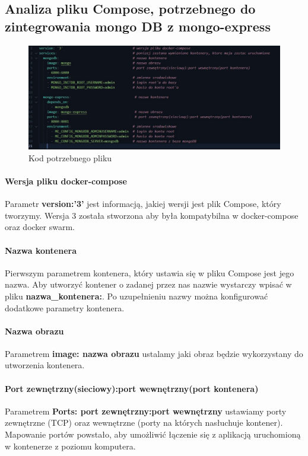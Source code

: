 \documentclass[12pt, a4paper]{article}
\begin{document}
    \subsection{Analiza pliku Compose, potrzebnego do zintegrowania mongo DB z mongo-express}
        \begin{figure}[!h]
            \centering
            \includegraphics[width=\textwidth]{docker-compose.JPG}
            \caption{Kod potrzebnego pliku}
            \label{fig:kod_docker-compose}
        \end{figure}
        \paragraph{Wersja pliku docker-compose} Parametr \textbf{version:'3'} jest informacją, jakiej wersji jest plik  Compose, który tworzymy. Wersja 3 została stworzona aby była kompatybilna w docker-compose oraz docker swarm.
        \paragraph{Nazwa kontenera} Pierwszym parametrem kontenera, który ustawia się w pliku Compose jest jego nazwa. Aby utworzyć kontener o zadanej przez nas nazwie wystarczy wpisać w pliku \textbf{nazwa\_kontenera:}. Po uzupełnieniu nazwy można konfigurować dodatkowe parametry kontenera.
        \paragraph{Nazwa obrazu} Parametrem \textbf{image: nazwa obrazu} ustalamy jaki obraz będzie wykorzystany do utworzenia kontenera.
        \paragraph{Port zewnętrzny(sieciowy):port wewnętrzny(port kontenera)} Parametrem \textbf{Ports: port zewnętrzny:port wewnętrzny} ustawiamy porty zewnętrzne (TCP) oraz wewnętrzne (porty na których nasłuchuje kontener). Mapowanie portów powstało, aby umożliwić łączenie się z aplikacją uruchomioną w kontenerze z poziomu komputera.
\end{document}
